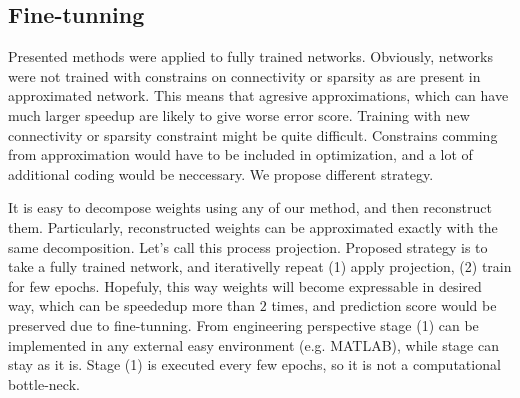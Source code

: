 \subsection{Fine-tunning}\label{sec:fine_tunning}

Presented methods were applied to fully trained networks. Obviously, networks were not trained
with constrains on connectivity or sparsity as are present in approximated network. This means 
that agresive approximations, which can have much larger speedup are likely to give worse error score. 
Training with new connectivity or sparsity constraint might be quite difficult. Constrains 
comming from approximation would have to be included in optimization, and a lot of additional coding would be
neccessary. We propose different strategy. 


It is easy to decompose weights using any of our method, and then reconstruct them. Particularly,
reconstructed weights can be approximated exactly with the same decomposition. Let's call this process
projection. Proposed strategy is to take a fully trained network, and iterativelly repeat (1) apply projection, 
(2) train for few epochs. Hopefuly, this way weights will become expressable in desired way, which can be speededup
more than $2$ times, and prediction score would be preserved due to fine-tunning. From engineering perspective
stage (1) can be implemented in any external easy environment (e.g. MATLAB), while stage can stay as it is. 
Stage (1) is executed every few epochs, so it is not a computational bottle-neck.
